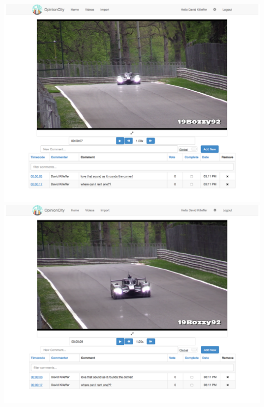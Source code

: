 \begin{enumerate}
{\centering\includegraphics[width=1\textwidth]{gfx/opinion-city/car1.pdf}} \\
{\centering\includegraphics[width=1\textwidth]{gfx/opinion-city/car2.pdf}} \\




\end{enumerate}
